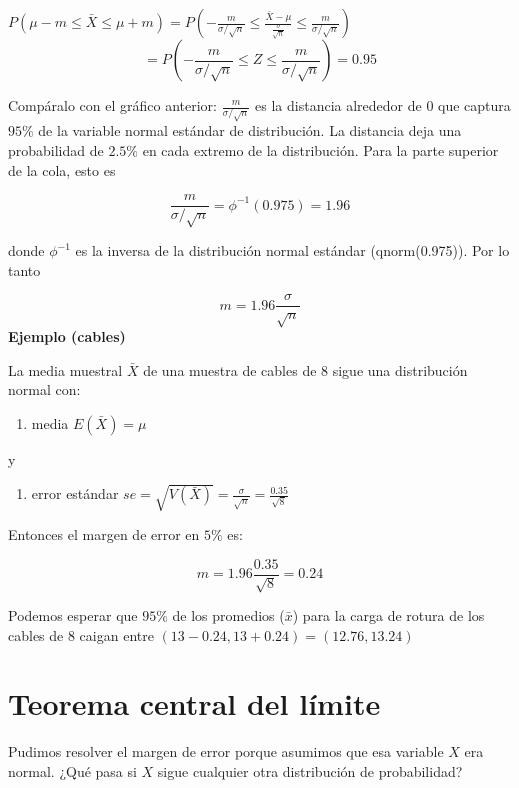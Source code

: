 \documentclass[
]{book}
\providecommand{\tightlist}{%
  \setlength{\itemsep}{0pt}\setlength{\parskip}{0pt}}
\begin{document}
\(P(\mu-m \leq \bar{X} \leq\mu + m)=P(-\frac{m}{\sigma/\sqrt{n}} \leq \frac{\bar{X} -\mu}{\frac{\sigma}{\sqrt{n}}}\leq\frac{m}{\sigma/\sqrt{n}})\)
\[=P(-\frac{m}{\sigma/\sqrt{n}} \leq Z \leq\frac{m}{\sigma/\sqrt{n}})=0.95\]

Compáralo con el gráfico anterior: \(\frac{m}{\sigma/\sqrt{n}}\) es la distancia alrededor de \(0\) que captura \(95\%\) de la variable normal estándar de distribución. La distancia deja una probabilidad de \(2.5\%\) en cada extremo de la distribución. Para la parte superior de la cola, esto es

\[\frac{m}{\sigma/\sqrt{n}}=\phi^{-1}(0.975)=1.96\]

donde \(\phi^{-1}\) es la inversa de la distribución normal estándar (qnorm(0.975)). Por lo tanto

\[m=1.96 \frac{\sigma}{\sqrt{n}}\]
\textbf{Ejemplo (cables)}

La media muestral \(\bar{X}\) de una muestra de cables de \(8\) sigue una distribución normal con:

\begin{enumerate}
\def\labelenumi{\arabic{enumi}.}
\tightlist
\item
  media \(E(\bar{X})=\mu\)
\end{enumerate}

y

\begin{enumerate}
\def\labelenumi{\arabic{enumi}.}
\setcounter{enumi}{1}
\tightlist
\item
  error estándar \(se=\sqrt{V(\bar{X})}=\frac{\sigma}{\sqrt{n}}=\frac{0.35}{\sqrt{8}}\)
\end{enumerate}

Entonces el margen de error en \(5\%\) es:

\[m=1.96\frac{0.35}{\sqrt{8}}=0.24\]

Podemos esperar que \(95\%\) de los promedios (\(\bar{x}\)) para la carga de rotura de los cables de \(8\) caigan entre \((13-0.24, 13+0.24)=(12.76, 13.24)\)

\hypertarget{teorema-central-del-luxedmite-1}{%
\section{Teorema central del límite}\label{teorema-central-del-luxedmite-1}}

Pudimos resolver el margen de error porque asumimos que esa variable \(X\) era normal. ¿Qué pasa si \(X\) sigue cualquier otra distribución de probabilidad?
\end{document}
